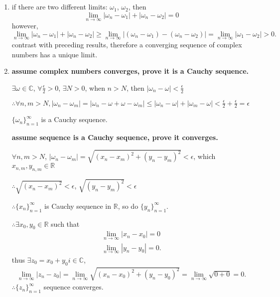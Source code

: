\documentclass[a4paper]{article}
\begin{document}
\subsection{}
\begin{enumerate}[label=(\alph*)]
    \item if there are two different limits: $\omega_1$, $\omega_2$,
        then 
        $$\lim_{n \to \infty} |\omega_n-\omega_1|+|\omega_n-\omega_2|=0$$
        however,
        $$\lim_{n \to \infty} |\omega_n-\omega_1|+|\omega_n-\omega_2|\ge \lim_{n \to \infty} |(\omega_n-\omega_1)-(\omega_n-\omega_2)|=\lim_{n \to \infty} |\omega_1-\omega_2|> 0.$$
        contrast with preceding results, therefore a converging sequence of complex numbers has a unique limit.
    \item \textbf{assume complex numbers converges, prove it is a Cauchy sequence.}

    $\exists\omega\in \mathbb{C}$, $\forall \frac{\epsilon}{2} >0$, $\exists N>0$, when $n>N$, then $|\omega_n-\omega|<\frac{\epsilon}{2}$

    $\therefore \forall n, m > N, |\omega_n-\omega_m|=|\omega_n-\omega+\omega-\omega_m|\le |\omega_n-\omega|+|\omega_m-\omega|<\frac{\epsilon}{2}+\frac{\epsilon}{2}=\epsilon$

    $\{\omega_n\}^\infty_{n=1}$ is a Cauchy sequence.

    \textbf{assume sequence is a Cauchy sequence, prove it converges.}

    $\forall n, m > N$, $|\omega_n-\omega_m|=\sqrt{(x_n-x_m)^2+(y_n-y_m)^2} <\epsilon$, which $x_{n,m}, y_{n,m}\in \mathbb{R}$

    $\therefore \sqrt{(x_n-x_m)^2} < \epsilon$, $\sqrt{(y_n-y_m)^2} < \epsilon$

    $\therefore \{x_n\}^{\infty}_{n=1}$ is Cauchy sequence in $\mathbb{R}$, so do $\{y_n\}^{\infty}_{n=1} $.

    $\therefore \exists x_0, y_0 \in \mathbb{R} $ such that
    \begin{align*}
        \lim_{n \to \infty} |x_n-x_0|=0\\
        \lim_{n \to \infty} |y_n-y_0|=0
    .\end{align*}
    thus $\exists z_0=x_0+y_0i \in \mathbb{C}$,
    \begin{align*}
        \lim_{n \to \infty} |z_n-z_0|=\lim_{n \to \infty} \sqrt{(x_n-x_0)^2+(y_n-y_0)^2} =\lim_{n \to \infty} \sqrt{0+0}  =0
    .\end{align*}
    $\therefore \{z_n\}^{\infty}_{n=1}$ sequence converges.


\end{enumerate}
\end{document}
